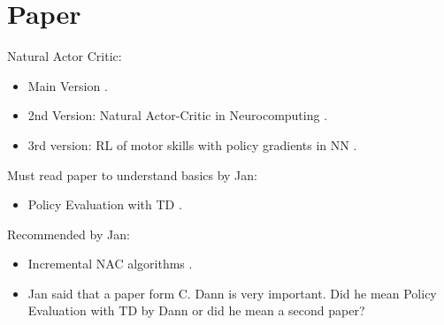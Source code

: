 
\author{First Author         \and
        Second Author %
}



\date{Received: date / Accepted: date}


\maketitle

\newpage

\section{Paper}
Natural Actor Critic:
\begin{itemize}
	\item Main Version \cite{peters2005natural}.
	\item 2nd Version: Natural Actor-Critic in Neurocomputing \cite{peters2008natural}.
	\item 3rd version: RL of motor skills with policy gradients in NN \cite{peters2008reinforcement}.
\end{itemize}

\noindent Must read paper to understand basics by Jan:
\begin{itemize}
	\item Policy Evaluation with TD \cite{dann2014policy}.
\end{itemize}

\noindent Recommended by Jan:
\begin{itemize}
	\item Incremental NAC algorithms \cite{bhatnagar2008incremental}.
	\item Jan said that a paper form C. Dann is very important. Did he mean Policy Evaluation with TD by Dann or did he mean a second paper?
\end{itemize}

